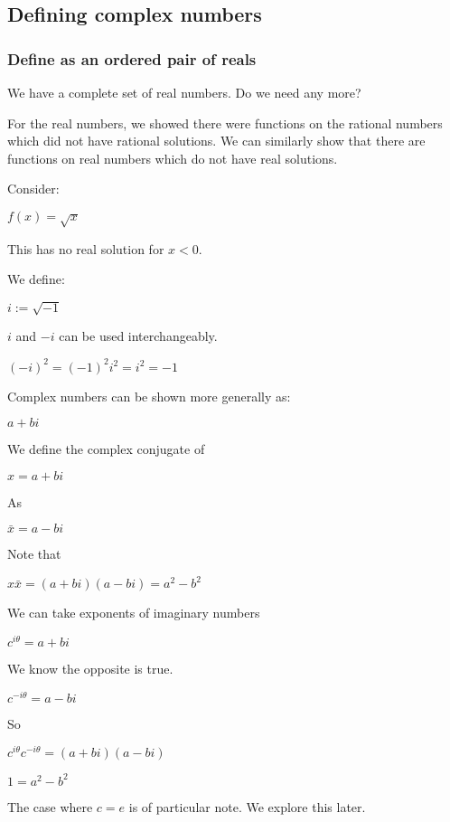 
\subsection{Defining complex numbers}
\subsubsection{Define as an ordered pair of reals}

We have a complete set of real numbers. Do we need any more?

For the real numbers, we showed there were functions on the rational numbers which did not have rational solutions. We can similarly show that there are functions on real numbers which do not have real solutions.

Consider:

\(f(x)=\sqrt x\)

This has no real solution for \(x<0\).

We define:

\(i:=\sqrt {-1}\)

\(i\) and \(-i\) can be used interchangeably.

\((-i)^2=(-1)^2i^2=i^2=-1\)

Complex numbers can be shown more generally as:

\(a+bi\)

We define the complex conjugate of

\(x=a+bi\)

As

\(\bar x=a-bi\)

Note that

\(x\bar x=(a+bi)(a-bi)=a^2-b^2\)

We can take exponents of imaginary numbers

\(c^{i\theta}=a+bi\)

We know the opposite is true.

\(c^{-i\theta}=a-bi\)

So

\(c^{i\theta}c^{-i\theta}=(a+bi)(a-bi)\)

\(1=a^2-b^2\)

The case where \(c=e\) is of particular note. We explore this later.

